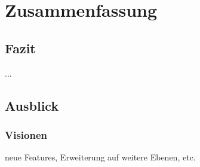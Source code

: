 \chapter{Zusammenfassung}

\section{Fazit}

...

\section{Ausblick}
\subsection{Visionen} neue Features, Erweiterung auf weitere Ebenen, etc. 

